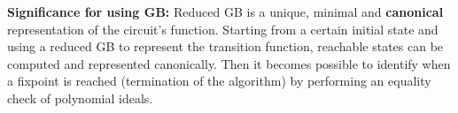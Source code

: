 \begin{Example}
% 
\end{Example}

{\bf Significance for using GB:} Reduced GB is a unique, minimal and
{\bf canonical} representation of the circuit's function. Starting
from a certain initial state and using a reduced GB to represent the
transition function, reachable states can be computed and represented
canonically. Then it becomes possible to identify  when a fixpoint
is reached (termination of the algorithm) by performing an equality
check of polynomial ideals. 

